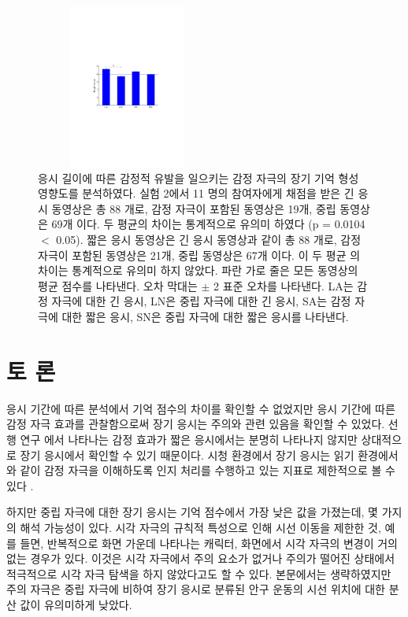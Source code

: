 \documentclass{kcc}
\begin{document}
\begin{figure}
  \centerline{\includegraphics[width=60mm,height=54mm,trim=55mm 108mm 58mm 105mm]{./eps/memtest_nested}}
  \caption{응시 길이에 따른 감정적 유발을 일으키는 감정 자극의 장기 기억 형성 영향도를 분석하였다. 실험 2에서 11 명의 참여자에게 채점을 받은 긴 응시 동영상은 총 88 개로, 감정 자극이 포함된 동영상은 19개, 중립 동영상은 69개 이다. 두 평균의 차이는 통계적으로 유의미 하였다 (p = 0.0104 $<$ 0.05). 짧은 응시 동영상은 긴 응시 동영상과 같이 총 88 개로, 감정 자극이 포함된 동영상은 21개, 중립 동영상은 67개 이다. 이 두 평균 의 차이는 통계적으로 유의미 하지 않았다. 파란 가로 줄은 모든 동영상의 평균 점수를 나타낸다. 오차 막대는 $\pm$ 2 표준 오차를 나타낸다. LA는 감정 자극에 대한 긴 응시, LN은 중립 자극에 대한 긴 응시, SA는 감정 자극에 대한 짧은 응시, SN은 중립 자극에 대한 짧은 응시를 나타낸다.}
  \label{fig:memtest-nested}
\end{figure}


\section{토 론}
응시 기간에 따른 분석에서 기억 점수의 차이를 확인할 수 없었지만 응시 기간에 따른 감정 자극 효과를 관찰함으로써 장기 응시는 주의와 관련 있음을 확인할 수 있었다. 선행 연구 \cite{Cahill1996amyg,Cahill1998baso}에서 나타나는 감정 효과가 짧은 응시에서는 분명히 나타나지 않지만 상대적으로 장기 응시에서 확인할 수 있기 때문이다. 시청 환경에서 장기 응시는 읽기 환경에서와 같이 감정 자극을 이해하도록 인지 처리를 수행하고 있는 지표로 제한적으로 볼 수 있다 \cite{Rayner1997}. 

하지만 중립 자극에 대한 장기 응시는 기억 점수에서 가장 낮은 값을 가졌는데, 몇 가지의 해석 가능성이 있다. 시각 자극의 규칙적 특성으로 인해 시선 이동을 제한한 것, 예를 들면, 반복적으로 화면 가운데 나타나는 캐릭터, 화면에서 시각 자극의 변경이 거의 없는 경우가 있다. 이것은 시각 자극에서 주의 요소가 없거나 주의가 떨어진 상태에서 적극적으로 시각 자극 탐색을 하지 않았다고도 할 수 있다. 본문에서는 생략하였지만 주의 자극은 중립 자극에 비하여 장기 응시로 분류된 안구 운동의 시선 위치에 대한 분산 값이 유의미하게 낮았다. 
\end{document}
